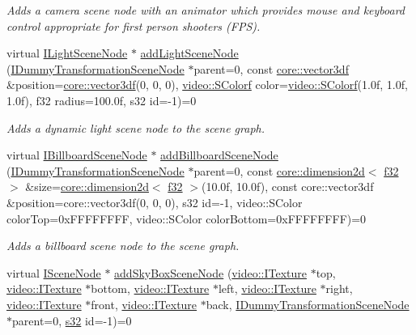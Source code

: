\begin{DoxyCompactItemize}
\begin{DoxyCompactList}\small\item\em Adds a camera scene node with an animator which provides mouse and keyboard control appropriate for first person shooters (F\+PS). \end{DoxyCompactList}\item 
virtual \hyperlink{classirr_1_1scene_1_1ILightSceneNode}{I\+Light\+Scene\+Node} $\ast$ \hyperlink{classirr_1_1scene_1_1ISceneManager_ac832789009b7670a90eb0e3250397a83}{add\+Light\+Scene\+Node} (\hyperlink{classirr_1_1scene_1_1IDummyTransformationSceneNode}{I\+Dummy\+Transformation\+Scene\+Node} $\ast$parent=0, const \hyperlink{namespaceirr_1_1core_a06f169d08b5c429f5575acb7edbad811}{core\+::vector3df} \&position=\hyperlink{namespaceirr_1_1core_a06f169d08b5c429f5575acb7edbad811}{core\+::vector3df}(0, 0, 0), \hyperlink{classirr_1_1video_1_1SColorf}{video\+::\+S\+Colorf} color=\hyperlink{classirr_1_1video_1_1SColorf}{video\+::\+S\+Colorf}(1.\+0f, 1.\+0f, 1.\+0f), f32 radius=100.\+0f, s32 id=-\/1)=0
\begin{DoxyCompactList}\small\item\em Adds a dynamic light scene node to the scene graph. \end{DoxyCompactList}\item 
virtual \hyperlink{classirr_1_1scene_1_1IBillboardSceneNode}{I\+Billboard\+Scene\+Node} $\ast$ \hyperlink{classirr_1_1scene_1_1ISceneManager_a580bb5e0db1043e9c57874b87a7d3b8a}{add\+Billboard\+Scene\+Node} (\hyperlink{classirr_1_1scene_1_1IDummyTransformationSceneNode}{I\+Dummy\+Transformation\+Scene\+Node} $\ast$parent=0, const \hyperlink{classirr_1_1core_1_1dimension2d}{core\+::dimension2d}$<$ \hyperlink{namespaceirr_a0277be98d67dc26ff93b1a6a1d086b07}{f32} $>$ \&size=\hyperlink{classirr_1_1core_1_1dimension2d}{core\+::dimension2d}$<$ \hyperlink{namespaceirr_a0277be98d67dc26ff93b1a6a1d086b07}{f32} $>$(10.\+0f, 10.\+0f), const core\+::vector3df \&position=core\+::vector3df(0, 0, 0), s32 id=-\/1, video\+::\+S\+Color color\+Top=0x\+F\+F\+F\+F\+F\+F\+F\+F, video\+::\+S\+Color color\+Bottom=0x\+F\+F\+F\+F\+F\+F\+F\+F)=0
\begin{DoxyCompactList}\small\item\em Adds a billboard scene node to the scene graph. \end{DoxyCompactList}\item 
virtual \hyperlink{classirr_1_1scene_1_1ISceneNode}{I\+Scene\+Node} $\ast$ \hyperlink{classirr_1_1scene_1_1ISceneManager_acd697396eaef0d1d22e7bb32abbf7d55}{add\+Sky\+Box\+Scene\+Node} (\hyperlink{classirr_1_1video_1_1ITexture}{video\+::\+I\+Texture} $\ast$top, \hyperlink{classirr_1_1video_1_1ITexture}{video\+::\+I\+Texture} $\ast$bottom, \hyperlink{classirr_1_1video_1_1ITexture}{video\+::\+I\+Texture} $\ast$left, \hyperlink{classirr_1_1video_1_1ITexture}{video\+::\+I\+Texture} $\ast$right, \hyperlink{classirr_1_1video_1_1ITexture}{video\+::\+I\+Texture} $\ast$front, \hyperlink{classirr_1_1video_1_1ITexture}{video\+::\+I\+Texture} $\ast$back, \hyperlink{classirr_1_1scene_1_1IDummyTransformationSceneNode}{I\+Dummy\+Transformation\+Scene\+Node} $\ast$parent=0, \hyperlink{namespaceirr_ac66849b7a6ed16e30ebede579f9b47c6}{s32} id=-\/1)=0

\end{DoxyCompactItemize}
